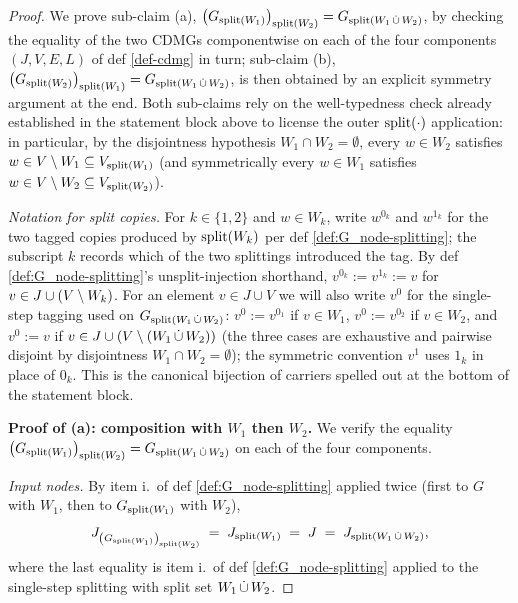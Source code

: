 \documentclass[main]{subfiles}
\begin{document}
\begin{proof}
We prove sub-claim (a), $\left ( G_{\mathrm{split}(W_1)} \right )_{\mathrm{split}(W_2)} = G_{\mathrm{split}(W_1 \,\dot{\cup}\, W_2)}$, by checking the equality of the two CDMGs componentwise on each of the four components $(J, V, E, L)$ of def \ref{def-cdmg} in turn; sub-claim (b), $\left ( G_{\mathrm{split}(W_2)} \right )_{\mathrm{split}(W_1)} = G_{\mathrm{split}(W_1 \,\dot{\cup}\, W_2)}$, is then obtained by an explicit symmetry argument at the end. Both sub-claims rely on the well-typedness check already established in the statement block above to license the outer $\mathrm{split}(\cdot)$ application: in particular, by the disjointness hypothesis $W_1 \cap W_2 = \emptyset$, every $w \in W_2$ satisfies $w \in V \setminus W_1 \subseteq V_{\mathrm{split}(W_1)}$ (and symmetrically every $w \in W_1$ satisfies $w \in V \setminus W_2 \subseteq V_{\mathrm{split}(W_2)}$).

\smallskip\noindent\emph{Notation for split copies.}
For $k \in \{1, 2\}$ and $w \in W_k$, write $w^{0_k}$ and $w^{1_k}$ for the two tagged copies produced by $\mathrm{split}(W_k)$ per def \ref{def:G_node-splitting}; the subscript $k$ records which of the two splittings introduced the tag. By def \ref{def:G_node-splitting}'s unsplit-injection shorthand, $v^{0_k} := v^{1_k} := v$ for $v \in J \cup (V \setminus W_k)$. For an element $v \in J \cup V$ we will also write $v^0$ for the single-step tagging used on $G_{\mathrm{split}(W_1 \,\dot{\cup}\, W_2)}$: $v^0 := v^{0_1}$ if $v \in W_1$, $v^0 := v^{0_2}$ if $v \in W_2$, and $v^0 := v$ if $v \in J \cup (V \setminus (W_1 \,\dot{\cup}\, W_2))$ (the three cases are exhaustive and pairwise disjoint by disjointness $W_1 \cap W_2 = \emptyset$); the symmetric convention $v^1$ uses $1_k$ in place of $0_k$. This is the canonical bijection of carriers spelled out at the bottom of the statement block.

\medskip\noindent\textbf{Proof of (a): composition with $W_1$ then $W_2$.}
We verify the equality $\left ( G_{\mathrm{split}(W_1)} \right )_{\mathrm{split}(W_2)} = G_{\mathrm{split}(W_1 \,\dot{\cup}\, W_2)}$ on each of the four components.

\medskip\noindent\emph{Input nodes.}
By item i.\ of def \ref{def:G_node-splitting} applied twice (first to $G$ with $W_1$, then to $G_{\mathrm{split}(W_1)}$ with $W_2$),
\[
    J_{\left ( G_{\mathrm{split}(W_1)} \right )_{\mathrm{split}(W_2)}} \;=\; J_{\mathrm{split}(W_1)} \;=\; J \;=\; J_{\mathrm{split}(W_1 \,\dot{\cup}\, W_2)},
\]
where the last equality is item i.\ of def \ref{def:G_node-splitting} applied to the single-step splitting with split set $W_1 \,\dot{\cup}\, W_2$. \checkmark


\end{proof}
\end{document}
